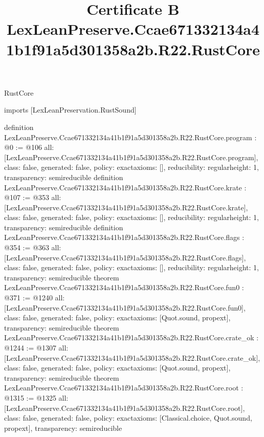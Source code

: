 \begin{lexlean}{RustCore}
\title{Certificate B LexLeanPreserve.Ccae671332134a41b1f91a5d301358a2b.R22.RustCore}
\begin{coremodule}
imports [LexLeanPreservation.RustSound]

definition LexLeanPreserve.Ccae671332134a41b1f91a5d301358a2b.R22.RustCore.program : @0 := @106 {
  all: [LexLeanPreserve.Ccae671332134a41b1f91a5d301358a2b.R22.RustCore.program],
  class: false,
  generated: false,
  policy: exact{axioms: []},
  reducibility: regular{height: 1},
  transparency: semireducible
}
definition LexLeanPreserve.Ccae671332134a41b1f91a5d301358a2b.R22.RustCore.krate : @107 := @353 {
  all: [LexLeanPreserve.Ccae671332134a41b1f91a5d301358a2b.R22.RustCore.krate],
  class: false,
  generated: false,
  policy: exact{axioms: []},
  reducibility: regular{height: 1},
  transparency: semireducible
}
definition LexLeanPreserve.Ccae671332134a41b1f91a5d301358a2b.R22.RustCore.flags : @354 := @363 {
  all: [LexLeanPreserve.Ccae671332134a41b1f91a5d301358a2b.R22.RustCore.flags],
  class: false,
  generated: false,
  policy: exact{axioms: []},
  reducibility: regular{height: 1},
  transparency: semireducible
}
theorem LexLeanPreserve.Ccae671332134a41b1f91a5d301358a2b.R22.RustCore.fun0 : @371 := @1240 {
  all: [LexLeanPreserve.Ccae671332134a41b1f91a5d301358a2b.R22.RustCore.fun0],
  class: false,
  generated: false,
  policy: exact{axioms: [Quot.sound, propext]},
  transparency: semireducible
}
theorem LexLeanPreserve.Ccae671332134a41b1f91a5d301358a2b.R22.RustCore.crate_ok : @1244 := @1307 {
  all: [LexLeanPreserve.Ccae671332134a41b1f91a5d301358a2b.R22.RustCore.crate_ok],
  class: false,
  generated: false,
  policy: exact{axioms: [Quot.sound, propext]},
  transparency: semireducible
}
theorem LexLeanPreserve.Ccae671332134a41b1f91a5d301358a2b.R22.RustCore.root : @1315 := @1325 {
  all: [LexLeanPreserve.Ccae671332134a41b1f91a5d301358a2b.R22.RustCore.root],
  class: false,
  generated: false,
  policy: exact{axioms: [Classical.choice, Quot.sound, propext]},
  transparency: semireducible
}


\end{coremodule}
\end{lexlean}
